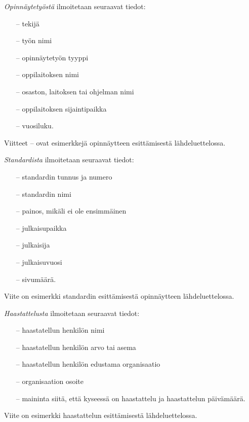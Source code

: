 \documentclass[finnish, 12pt, a4paper, elec, utf8, a-2b, online]{aaltothesis}
\begin{document}
\noindent
\textit{Opinnäytetyöstä} ilmoitetaan seuraavat tiedot:
\begin{itemize}
	\setlength{\itemsep}{-3pt}
	\item[--]tekijä
	\item[--]työn nimi
	\item[--]opinnäytetyön tyyppi
	\item[--]oppilaitoksen nimi
	\item[--]osaston, laitoksen tai ohjelman nimi
	\item[--]oppilaitoksen sijaintipaikka
	\item[--]vuosiluku.
\end{itemize}
Viitteet \cite{Miinusmaa}--\cite{Lonnqvist} ovat esimerkkejä opinnäytteen 
esittämisestä lähdeluettelossa. 

\noindent
\textit{Standardista} ilmoitetaan seuraavat tiedot:
\begin{itemize}
	\setlength{\itemsep}{-3pt}
	\item[--]standardin tunnus ja numero
	\item[--]standardin nimi
	\item[--]painos, mikäli ei ole ensimmäinen
	\item[--]julkaisupaikka
	\item[--]julkaisija
	\item[--]julkaisuvuosi
	\item[--]sivumäärä.
\end{itemize}
Viite \cite{sfs} on esimerkki standardin esittämisestä opinnäytteen
lähdeluettelossa. 

\noindent
\textit{Haastattelusta} ilmoitetaan seuraavat tiedot:
\begin{itemize}
	\setlength{\itemsep}{-3pt}
	\item[--]haastatellun henkilön nimi
	\item[--]haastatellun henkilön arvo tai asema
	\item[--]haastatellun henkilön edustama organisaatio
	\item[--]organisaation osoite
	\item[--]maininta siitä, että kyseessä on haastattelu ja haastattelun
	päivämäärä. 
\end{itemize}
Viite \cite{haastattelu} on esimerkki haastattelun esittämisestä 
lähdeluettelossa.
\end{document}
